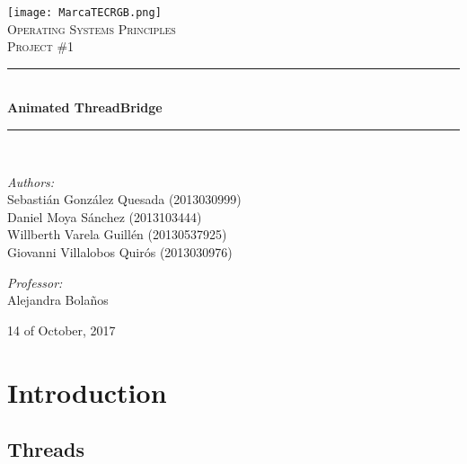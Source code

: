 \documentclass[a4paper,9pt]{article}
\newcommand{\HRule}{\rule{\linewidth}{0.5mm}}
\begin{document}
\begin{titlepage}
\begin{center}

\texttt{[image: MarcaTECRGB.png]}~\\[2.5cm]

\textsc{\LARGE Operating Systems Principles}\\[2.5cm]

\textsc{\Large Project \#1}\\[1.5cm]



\HRule \\[0.3cm]
{ \huge \bfseries Animated ThreadBridge \\[0.4cm] }

\HRule \\[3.5cm]

\begin{minipage}{0.5\textwidth}
\begin{flushleft} \large 
\emph{Authors:}\\
Sebastián González Quesada (2013030999)\\
Daniel Moya Sánchez (2013103444) \\
Willberth Varela Guillén (20130537925) \\
Giovanni Villalobos Quirós (2013030976)
\end{flushleft}
\end{minipage}
\begin{minipage}{0.4\textwidth}
\begin{flushright} \large
\emph{\hspace{-5ex}Professor:}\\
Alejandra Bolaños
\end{flushright}
\end{minipage}

\vfill

{\large}
14 of October, 2017

\end{center}
\end{titlepage}

\section{Introduction}

\subsection{Threads}
\end{document}
